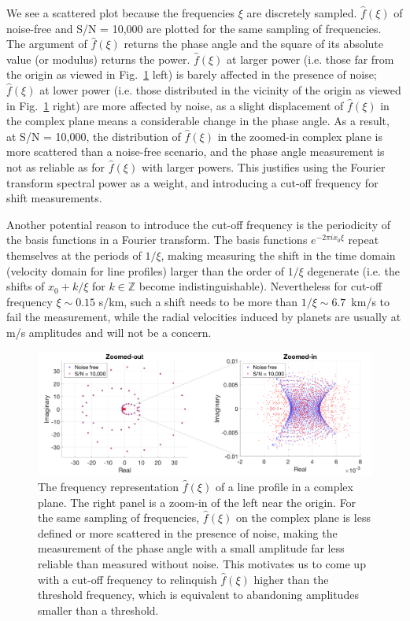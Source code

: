 We see a scattered plot because the frequencies $\xi$ are discretely sampled. $\hat{f}(\xi)$ of noise-free and S/N = 10,000 are plotted for the same sampling of frequencies. The argument of $\hat{f}(\xi)$ returns the phase angle and the square of its absolute value (or modulus) returns the power. $\hat{f}(\xi)$ at larger power (i.e. those far from the origin as viewed in Fig.~\ref{fig:FT_compelx_plane} left) is barely affected in the presence of noise; $\hat{f}(\xi)$ at lower power (i.e. those distributed in the vicinity of the origin as viewed in Fig.~\ref{fig:FT_compelx_plane} right) are more affected by noise, as a slight displacement of $\hat{f}(\xi)$ in the complex plane means a considerable change in the phase angle. As a result, at S/N = 10,000, the distribution of $\hat{f}(\xi)$ in the zoomed-in complex plane is more scattered than a noise-free scenario, and the phase angle measurement is not as reliable as for $\hat{f}(\xi)$ with larger powers. This justifies using the Fourier transform spectral power as a weight, and introducing a cut-off frequency for shift measurements. 

Another potential reason to introduce the cut-off frequency is the periodicity of the basis functions in a Fourier transform. The basis functions $e^{-2 \pi ix_0 \xi}$ repeat themselves at the periods of $1/\xi$, making measuring the shift in the time domain (velocity domain for line profiles) larger than the order of $1/\xi$ degenerate (i.e. the shifts of $x_0+k/\xi$ for $k\in\mathbb{Z}$ become indistinguishable). Nevertheless for cut-off frequency $\xi \sim 0.15$ s/km, such a shift needs to be more than $1/\xi\sim6.7$~km/s to fail the measurement, while the radial velocities induced by planets are usually at m/s amplitudes and will not be a concern.

\begin{figure}[tbp]
\centering
\includegraphics[width = 0.99 \linewidth]
{./Figures/Methods/7-complex_plane.png}
\caption[The frequency representation $\hat{f}(\xi)$ of a line profile in a complex plane]
{The frequency representation $\hat{f}(\xi)$ of a line profile in a complex plane. The right panel is a zoom-in of the left near the origin. For the same sampling of frequencies, $\hat{f}(\xi)$ on the complex plane is less defined or more scattered in the presence of noise, making the measurement of the phase angle with a small amplitude far less reliable than measured without noise. This motivates us to come up with a cut-off frequency to relinquish $\hat{f}(\xi)$ higher than the threshold frequency, which is equivalent to abandoning amplitudes smaller than a threshold.}
\label{fig:FT_compelx_plane}
\end{figure} 

